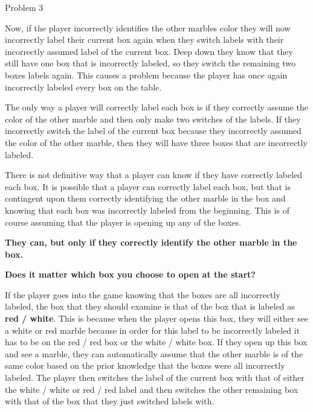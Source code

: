 \begin{problem}{Problem 3}
\begin{Highlight}[Solution]
        Now, if the player incorrectly identifies the other marbles color they will now incorrectly label their current box again when they switch labels with their incorrectly assumed label of the current box.
        Deep down they know that they still have one box that is incorrectly labeled, so they switch the remaining two boxes labels again. This causes a problem because the player has once again incorrectly labeled
        every box on the table.

        The only way a player will correctly label each box is if they correctly assume the color of the other marble and then only make two switches of the labels. If they incorrectly switch the label of the
        current box because they incorrectly assumed the color of the other marble, then they will have three boxes that are incorrectly labeled.

        There is not definitive way that a player can know if they have correctly labeled each box. It is possible that a player can correctly label each box, but that is contingent upon them correctly identifying
        the other marble in the box and knowing that each box was incorrectly labeled from the beginning. This is of course assuming that the player is opening up any of the boxes.

        \begin{center}
            \textbf{They can, but only if they correctly identify the other marble in the box.}
        \end{center}

        \noindent \textbf{Does it matter which box you choose to open at the start?} \vspace*{1em}

        If the player goes into the game knowing that the boxes are all incorrectly labeled, the box that they should examine is that of the box that is labeled as \textbf{red / white}. This is because when the player
        opens this box, they will either see a white or red marble because in order for this label to be incorrectly labeled it has to be on the red / red box or the white / white box. If they open up this box and see
        a marble, they can automatically assume that the other marble is of the same color based on the prior knowledge that the boxes were all incorrectly labeled. The player then switches the label of the current box
        with that of either the white / white or red / red label and then switches the other remaining box with that of the box that they just switched labels with. 


\end{Highlight}
\end{problem}
